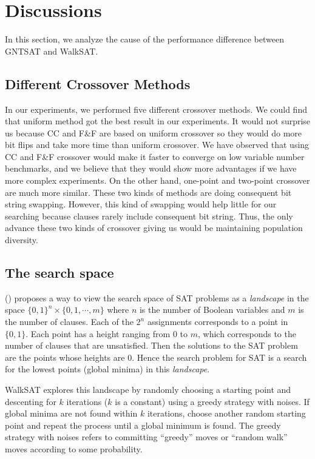 \section{Discussions}
In this section, we analyze the cause of the performance difference between
GNTSAT and WalkSAT.

\subsection{Different Crossover Methods}
In our experiments, we performed five different crossover methods. We could
find that uniform method got the best result in our experiments. It would not
surprise us because CC and F\&F are based on uniform crossover so they would do
more bit flips and take more time than uniform crossover. We have observed
that using CC and F\&F crossover would make it faster to converge on low
variable number benchmarks, and we believe that they would show more
advantages if we have more complex experiments. On the other hand, one-point
and two-point crossover are much more similar. These two kinds of methods are
doing consequent bit string swapping. However, this kind of swapping would
help little for our searching because clauses rarely include consequent bit
string. Thus, the only advance these two kinds of crossover giving us would be
maintaining population diversity.

\subsection{The search space}
\citeauthor{biere2009handbook} (\citeyear{biere2009handbook}) proposes a way to view the search space of
SAT problems as a \textit{landscape} in the space $\{0, 1\}^n \times \{0,1,\cdots,m\}$
where $n$ is the number of Boolean variables and
$m$ is the number of clauses. Each of the
$2^n$ assignments corresponds to a point in
$\{0,1\}$. Each point has a height ranging from
$0$ to $m$, which corresponds to the
number of clauses that are unsatisfied. Then the solutions to the SAT problem
are the points whose heights are $0$. Hence the search
problem for SAT is a search for the lowest points (global minima) in this
\textit{landscape}.

WalkSAT explores this landscape by randomly choosing a starting point and
descenting for $k$ iterations ($k$ is a
constant) using a greedy strategy with noises. If global minima are not found
within $k$ iterations, choose another random starting point
and repeat the process until a global minimum is found. The greedy strategy
with noises refers to committing ``greedy'' moves or ``random walk'' moves
according to some probability.

